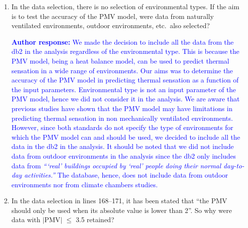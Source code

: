 \documentclass[a4paper, 10pt]{letter}
\newcommand{\response}[1]{\textcolor{blue}{\textbf{Author response:} #1}}
\begin{document}
\begin{letter}
\begin{enumerate}
            \item In the data selection, there is no selection of environmental types.
            If the aim is to test the accuracy of the PMV model, were data from naturally ventilated environments, outdoor environments, etc.\ also selected?

            \response{
                We made the decision to include all the data from the \ac{db2} in the analysis regardless of the environmental type.
                This is because the PMV model, being a heat balance model, can be used to predict thermal sensation in a wide range of environments.
                Our aims was to determine the accuracy of the PMV model in predicting thermal sensation as a function of the input parameters.
                Environmental type is not an input parameter of the PMV model, hence we did not consider it in the analysis.
                We are aware that previous studies have shown that the PMV model may have limitations in predicting thermal sensation in non mechanically ventilated environments.
                However, since both standards do not specify the type of environments for which the PMV model can and should be used, we decided to include all the data in the \ac{db2} in the analysis.
                It should be noted that we did not include data from outdoor environments in the analysis since the \ac{db2} only includes data from \textit{```real' buildings occupied by `real' people doing their normal day-to-day activities.''}
                The database, hence, does not include data from outdoor environments nor from climate chambers studies.
            }

            \item In the data selection in lines 168--171, it has been stated that ``the PMV should only be used when its absolute value is lower than 2''.
            So why were data with $|$PMV$|$ $\leq$ 3.5 retained?


\end{enumerate}
\end{letter}
\end{document}
